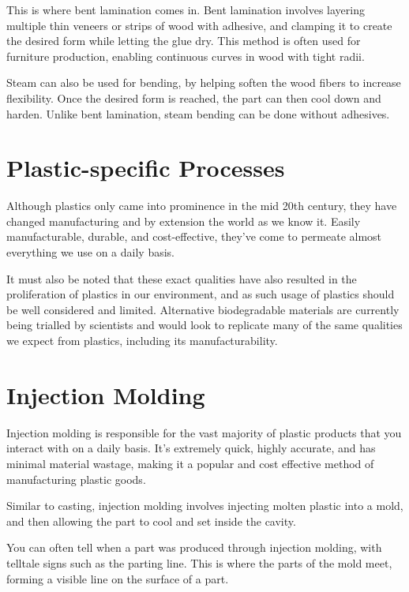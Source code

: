 This is where bent lamination comes in. Bent lamination involves layering multiple thin veneers or strips of wood with adhesive, and clamping it to create the desired form while letting the glue dry. This method is often used for furniture production, enabling continuous curves in wood with tight radii.


Steam can also be used for bending, by helping soften the wood fibers to increase flexibility. Once the desired form is reached, the part can then cool down and harden. Unlike bent lamination, steam bending can be done without adhesives.

\section{Plastic-specific Processes}

Although plastics only came into prominence in the mid 20th century, they have changed manufacturing and by extension the world as we know it. Easily manufacturable, durable, and cost-effective, they’ve come to permeate almost everything we use on a daily basis.

It must also be noted that these exact qualities have also resulted in the proliferation of plastics in our environment, and as such usage of plastics should be well considered and limited. Alternative biodegradable materials are currently being trialled by scientists and would look to replicate many of the same qualities we expect from plastics, including its manufacturability.

\section{Injection Molding}

Injection molding is responsible for the vast majority of plastic products that you interact with on a daily basis. It’s extremely quick, highly accurate, and has minimal material wastage, making it a popular and cost effective method of manufacturing plastic goods.

Similar to casting, injection molding involves injecting molten plastic into a mold, and then allowing the part to cool and set inside the cavity. 

You can often tell when a part was produced through injection molding, with telltale signs such as the parting line. This is where the parts of the mold meet, forming a visible line on the surface of a part.

